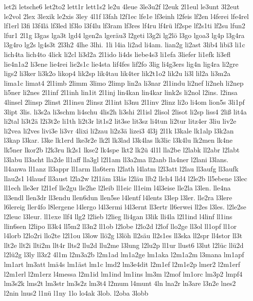 {let2i
letsche6
let2to2
lett1r
lett1s2
le2u
4leue
3le3u2f
l2euk
2l1eul
le3unt
3l2eut
le2vol
2lex
3lexik
le2xis
3ley
4l1f
l3fah
l2f1ec
lfe1e
lf3einh
l2feis
lf2en
l4ferei
lfe4rel
lf1erl
l3fi
l3f4lä
lf3led
lf3lo
l3f4lu
lf3ram
lf3res
lf4ru
lf4rü
lf2spe
lf2s1ti
lf2su
lfun2
lfur1
2l1g
l3gas
lga3t
lgd4
lgen2a
lgeräu3
l2geti
l3g2i
lg2lö
l3go
lgoa3
lg4p
l3g4ra
l3g4ro
lg2s
lg4s3t
2l3h2
4lhe
3lhi.
1li
l4ia
li2ad
li4am.
lian2g
li2ast
3lib4
libi3
li1c
lich4ta
lich4to
4lick
li2cl
li3d2a
2l1ido
li4ds
liebe4s3
li1efa
3liefer
li1efk
li3efl
lie4n1a2
li3ene
lie4rei
lie2s1c
lie4sta
lif4fes
lif2fo
3lig
li4g3ers
lig4n
lig4ra
li2gre
ligs2
li3ker
li3k2o
likop4
lik2sp
lik4tau
lik4ter
lik2t1o2
lik2u
li3l
lil2a
li3m2a
lima1c
limat4
2l1imb
2limm
3limo
2limp
lin2a
li3nar
2l1indu
li2nef
li2neh
li2nep
li5ner
li2nes
2l1inf
2l1inh
lin1it
2l1inj
lin4kan
lin4kar
link2s
li2nol
l2ins.
l2insa
4linsel
2linsp
2linst
2l1insu
2linsz
2l1int
li3nu
2l1inv
2linz
li2o
li4om
lion5s
3li1pf
3lipt
3lis.
li3s2a
li3schm
li4schu
4lis2h
li3shi
2l1isl
2lisol
2lisot
li2sp
liss4
2liß
lit4a
li2tal
li3t2ä
l2i3t2e
li1th
li2t3r
lit1s2
lit3se
lit3sz
li4tun
li2tur
litz4er
3liu
liv2e
li2vea
li2ves
livi3e
li3vr
4lixi
li2zau
li2z3ä
lizei3
4l3j
2l1k
l3kale
lk1alp
l3k2an
l3kap
l3kar.
l3ke
lk1erd
lke3r2e
lk2l
lk3lad
l3k4las
lk3lic
l3k4lu
lk2men
lk4ne
lk5ner
lkor2b
l2k3ru
lk2s1
lkse2
lk4spe
lkt2
lk2ü
4l1l
lla2be
l2labk
ll2abr
l2labt
l3labu
ll3acht
lla2de
ll1aff
lla3gl
l2l1am
ll3a2ma
ll2anb
lla4ner
l2lani
l3lans.
ll4anwa
ll1anz
ll3appr
ll1arm
lla6tern
l2lath
l4latm
l2l3att
l2lau
ll3aufg
ll3aufk
llau2s1
l4lausf
ll3aust
l2la2w
l2l1äm
l3läs
l2läu
llb2
llch4
lld4
l2le2b
ll5ebene
l3lec
ll1ech
lle3er
l2l1ef
lle2gu
lle2he
l2leib
ll1eic
ll1eim
l4l3eise
lle2la
l3len.
lle4na
ll3endl
llen3dr
ll3endu
llen6dun
llen5se
l4lentf
l4lents
l3lep
l3ler.
lle2ra
l3lere
l6lereig
ller4fo
l8lergene
l4lergo
l4l3ermi
l4l3ernt
ll3ertr
ll6erwei
ll2es
l3les.
l2le2se
l2leuc
l3leur.
ll1exe
llf4
llg2
l2lieb
l2lieg
lli4gan
l3lik
lli4la
l2l1ind
l4linf
ll1ins
llin6sen
l2lipo
ll3k4
ll5m2
ll3n2
ll1ob
l2lobe
l2lo2d
l2lof
llo2ge
ll3ol
ll1opf
ll1or
l4lorb
l2lo2ri
llo2te
l2l1ou
l3low
llö2g
l3löh
ll2säu
ll2s1es
ll3ska
ll2spr
ll4stor
ll3t
llt2e
llt2i
llti2m
llt4r
llts2
llu2d
llu2me
l3lung
l2lu2p
ll1ur
llust6
l3lut
l2lüc
llü2d
l2lü2g
l3ly
ll3z2
4l1m
l2m3a2b
l2m1ad
lm1a2ge
lm1aka
l2m1a2m
l3mana
lm1apf
lm1art
lm3att
lmä4s
lm1äst
lm1c
lmd2
lm3e4dit
l2m1ef
l2m1e2p
lmer2
l2m1erf
l2m1erl
l2m1erz
l4messa
l2m1id
lm1ind
lm1ins
lm3m
l2mof
lm1orc
lm3p2
lmpf4
lm3s2k
lms2t
lm3str
lm3s2z
lm3t4
l2mum
l4munt
4ln
lna2r
ln3are
l3n2e
lnes2
l2nin
lnus2
l1nü
l1ny
1lo
lo4ak
3lob.
l2oba
3lobb
}
